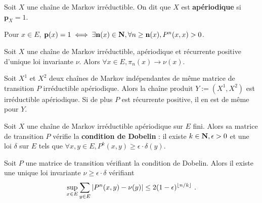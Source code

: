 	\begin{defn}
		Soit $X$ une chaîne de Markov irréductible.
		On dit que $X$ est \textbf{apériodique} si $\mathbf{p}_X = 1$.
	\end{defn}

	\begin{lem}
		Pour $x \in E$, $\mathbf{p}(x) = 1 \iff \exists \mathbf{n}(x) \in \mathbf{N}, \forall n \geq \mathbf{n}(x), P^n(x,x) > 0$.
	\end{lem}

	\begin{thm}
		Soit $X$ une chaîne de Markov irréductible, apériodique et récurrente positive d'unique loi invariante $\nu$.
		Alors $\forall x \in E, \pi_n(x) \longrightarrow \nu(x)$.
	\end{thm}

	\begin{pop}
		Soit $X^1$ et $X^2$ deux chaînes de Markov indépendantes de même matrice de transition $P$ irréductible apériodique.
		Alors la chaîne produit $Y := (X^1,X^2)$ est irréductible apériodique.
		Si de plus $P$ est récurrente positive, il en est de même pour $Y$.
	\end{pop}

	\begin{pop}
		Soit $X$ une chaîne de Markov irréductible apériodique sur $E$ fini.
		Alors sa matrice de transition $P$ vérifie la \textbf{condition de Dobelin} : il existe $k \in \mathbf{N}, \epsilon > 0$ et une loi $\delta$ sur $E$ tels que $\forall x,y \in E, P^k(x,y) \geq \epsilon \cdot \delta(y)$. 
	\end{pop}

	\begin{thm}
		Soit $P$ une matrice de transition vérifiant la condition de Dobelin.
		Alors il existe une unique loi invariante $\nu \geq \epsilon \cdot \delta$ vérifiant
		$$\sup_{x \in E} \sum_{y \in E} \abs{P^n(x,y) - \nu(y)} \leq 2(1 - \epsilon)^{\lfloor n/k \rfloor}\ .$$
	\end{thm}

